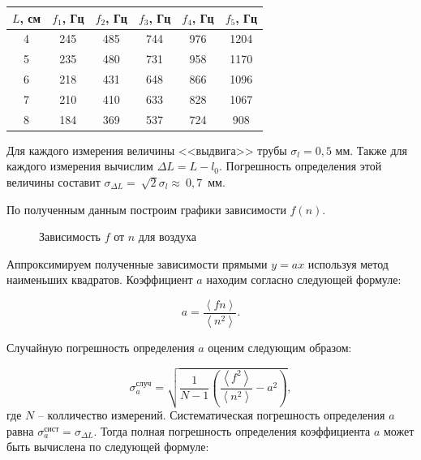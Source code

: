 \documentclass[a4paper,12pt]{article}
\theoremstyle{definition}
\begin{document}
	\begin{table}[H]
		\centering
		\begin{tabular}{|c|c|c|c|c|c|}
		\hline
		$L$, см & $f_1$, Гц & $f_2$, Гц & $f_3$, Гц & $f_4$, Гц & $f_5$, Гц \\ \hline
		4       & 245       & 485       & 744       & 976       & 1204      \\ \hline
		5       & 235       & 480       & 731       & 958       & 1170      \\ \hline
		6       & 218       & 431       & 648       & 866       & 1096      \\ \hline
		7       & 210       & 410       & 633       & 828       & 1067      \\ \hline
		8       & 184       & 369       & 537       & 724       & 908       \\ \hline
		\end{tabular}
		\end{table}
	Для каждого измерения величины <<выдвига>> трубы $ \sigma_l = 0,5 $ мм. Также для каждого измерения вычислим $ \Delta L = L - l_0 $. Погрешность определения этой величины составит $ \sigma_{\Delta L}=~\sqrt{2}\sigma_l \approx~0,7 $~мм.
	
	По полученным данным построим графики зависимости $ f(n) $.
	
	\begin{figure}[h!]
		\centering
		
		\caption{Зависимость $ f $ от $ n $ для воздуха}
		\label{graph1}
	\end{figure}
	
	Аппроксимируем полученные зависимости прямыми $ y=ax $ используя метод наименьших квадратов. Коэффициент $ a $ находим согласно следующей формуле:
	
	\begin{equation}\label{mnk:a}
		a=\frac{\left\langle fn \right\rangle}{\left\langle n^2 \right\rangle}.
	\end{equation}
	

	
	Случайную погрешность определения $ a $ оценим следующим образом:
	
	\begin{equation}\label{mnk:sigma_a}
		\sigma^\text{случ}_a=\sqrt{\frac{1}{N-1}\left(\frac{\left\langle f^2 \right\rangle}{\left\langle n^2 \right\rangle}-a^2\right)},
	\end{equation}
	где $ N $ -- колличество измерений. Систематическая погрешность определения $ a $ равна $ \sigma_a^\text{сист} = \sigma_{\Delta L} $. Тогда полная погрешность определения коэффициента $ a $ может быть вычислена по следующей формуле:
	
\end{document}
